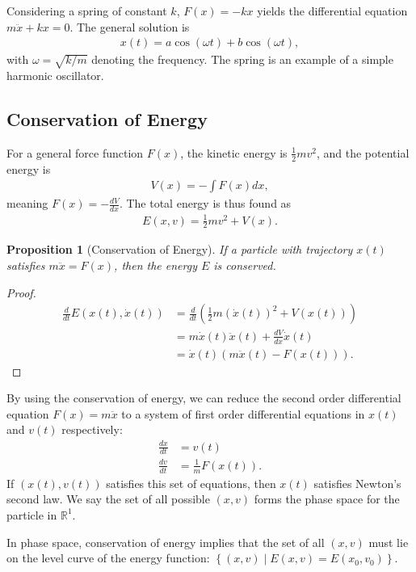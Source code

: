 \documentclass[12pt]{extarticle}
\newcommand{\R}{\mathbb{R}}
\newcommand{\set}[1]{\left\{#1\right\}}
\theoremstyle{plain}
\newtheorem*{proposition}{Proposition}%
\theoremstyle{definition}
\theoremstyle{remark}
\renewcommand{\newline}{\hfill\break}
\begin{document}
  Considering a spring of constant $k$, $F(x) = -kx$ yields the differential equation $m\ddot{x} + kx = 0$. The general solution is
  \begin{align*}
    x(t) = a\cos(\omega t) + b\cos(\omega t),
  \end{align*}
  with $\omega = \sqrt{k/m}$ denoting the frequency. The spring is an example of a simple harmonic oscillator.
  \subsection{Conservation of Energy}%
  For a general force function $F(x)$, the kinetic energy is $\frac{1}{2}mv^2$, and the potential energy is
  \begin{align*}
    V(x) = -\int F(x)dx,
  \end{align*}
  meaning $F(x) = -\frac{dV}{dx}$. The total energy is thus found as
  \begin{align*}
    E(x,v) = \frac{1}{2}mv^2 + V(x).
  \end{align*}
  \begin{proposition}[Conservation of Energy]
  If a particle with trajectory $x(t)$ satisfies $m\ddot{x} = F(x)$, then the energy $E$ is conserved.
  \end{proposition}
  \begin{proof}
    \begin{align*}
      \frac{d}{dt}E(x(t),\dot{x}(t)) &= \frac{d}{dt}\left(\frac{1}{2}m(\dot{x}(t))^2 + V(x(t))\right)\\
                                     &= m\dot{x}(t)\ddot{x}(t) + \frac{dV}{dx}\dot{x}(t)\\
                                     &= \dot{x}(t)\left(m\ddot{x}(t) - F(x(t))\right).
    \end{align*}
  \end{proof}
  By using the conservation of energy, we can reduce the second order differential equation $F(x) = m\ddot{x}$ to a system of first order differential equations in $x(t)$ and $v(t)$ respectively:
  \begin{align*}
    \frac{dx}{dt} &= v(t)\\
    \frac{dv}{dt} &= \frac{1}{m}F(x(t)).
  \end{align*}
  If $(x(t),v(t))$ satisfies this set of equations, then $x(t)$ satisfies Newton's second law. We say the set of all possible $(x,v)$ forms the phase space for the particle in $\R^1$.\newline

  In phase space, conservation of energy implies that the set of all $(x,v)$ must lie on the level curve of the energy function: $\set{(x,v)\mid E(x,v) = E(x_0,v_0)}$.\newline
\end{document}
